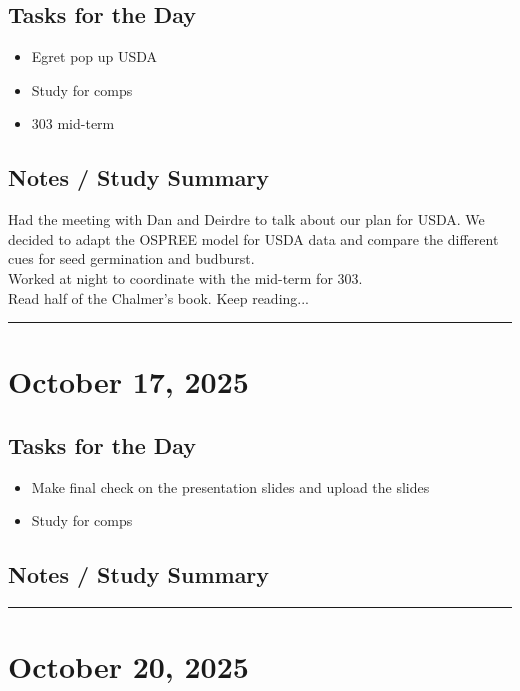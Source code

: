 \documentclass[12pt]{article}
\begin{document}
\subsection*{Tasks for the Day}
\begin{itemize}
    \item Egret pop up USDA
    \item Study for comps
    \item 303 mid-term
\end{itemize}
\subsection*{Notes / Study Summary}
Had the meeting with Dan and Deirdre to talk about our plan for USDA. We decided to adapt the OSPREE model for USDA data and compare the different cues for seed germination and budburst.\\
Worked at night to coordinate with the mid-term for 303.\\
Read half of the Chalmer's book. Keep reading...
\vspace{1em}
\hrule
\vspace{1em}

\section*{October 17, 2025}

\subsection*{Tasks for the Day}
\begin{itemize}
    \item Make final check on the presentation slides and upload the slides
    \item Study for comps
\end{itemize}
\subsection*{Notes / Study Summary}

\vspace{1em}
\hrule
\vspace{1em}

\section*{October 20, 2025}
\end{document}
